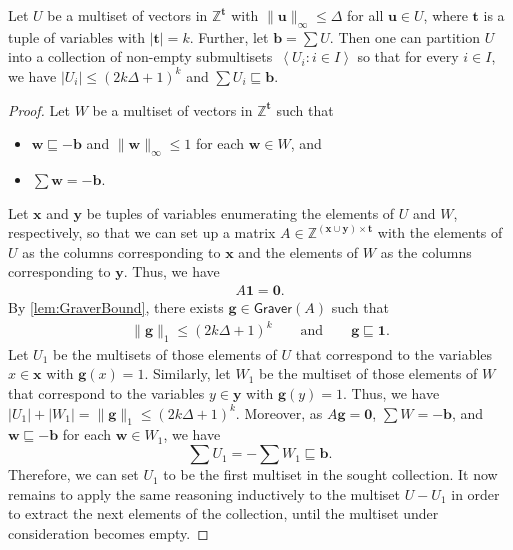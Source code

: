 \documentclass{article}
\renewcommand{\leq}{\leqslant}
\newcommand{\cfleq}{\sqsubseteq}
\newcommand{\Z}{\mathbb{Z}}
\newcommand{\tup}[1]{{\mathbf{#1}}}
\newcommand{\xx}{\tup x}
\newcommand{\ww}{\tup w}
\newcommand{\yy}{\tup y}
\newcommand{\tv}{\tup t}
\newcommand{\bb}{\tup b}
\renewcommand{\gg}{\tup g}
\newcommand{\uu}{\tup u}
\newcommand{\Graver}{\mathsf{Graver}}
\newcommand{\zero}{\tup 0}
\newcommand{\mset}[1]{\left\langle #1\right\rangle}
\renewcommand{\setminus}{-}
\begin{document}
\begin{lemma}\label{lem:bundling}
    Let $U$ be a multiset of vectors in $\Z^\tv$ with $\|\uu\|_\infty\leq \Delta$ for all $\uu\in U$, where $\tv$ is a tuple of variables with $|\tv|=k$. Further, let $\bb=\sum U$. Then one can partition $U$ into a collection of non-empty submultisets~$\mset{U_i\colon i\in I}$ so that for every $i\in I$, we have $|U_i|\leq (2k\Delta+1)^{k}$ and $\sum U_i \cfleq \bb$.
\end{lemma}
\begin{proof}
    Let $W$ be a multiset of vectors in $\Z^{\tv}$ such that
    \begin{itemize}[nosep]
        \item $\ww\cfleq -\bb$ and $\|\ww\|_\infty\leq 1$ for each $\ww\in W$, and
        \item $\sum \ww = -\bb$.
    \end{itemize}
    Let $\xx$ and $\yy$ be tuples of variables enumerating the elements of $U$ and $W$, respectively, so that we can set up a matrix $A\in \Z^{(\xx\cup \yy)\times \tv}$ with the elements of $U$ as the columns corresponding to $\xx$ and the elements of $W$ as the columns corresponding to $\yy$. Thus, we have
    \begin{align*}
        A\mathbf{1}=\zero.
    \end{align*}
    By \cref{lem:GraverBound}, there exists $\gg\in \Graver(A)$ such that
    \begin{align*}
        \|\gg\|_1\leq (2k\Delta+1)^{k}\qquad\textrm{and}\qquad \gg\cfleq \mathbf{1}.
    \end{align*}
    Let $U_1$ be the multisets of those elements of $U$ that correspond to the variables $x\in \xx$ with $\gg(x)=1$. Similarly, let $W_1$ be the multiset of those elements of $W$ that correspond to the variables $y\in \yy$ with $\gg(y)=1$. Thus, we have $|U_1|+|W_1|=\|\gg\|_1\leq (2k\Delta+1)^{k}$. Moreover, as $A\gg=\zero$, $\sum W=-\bb$, and $\ww\cfleq -\bb$ for each $\ww\in W_1$, we have
    \[\sum U_1=-\sum W_1\cfleq \bb.\]
    Therefore, we can set $U_1$ to be the first multiset in the sought collection. It now remains to apply the same reasoning inductively to the multiset $U\setminus U_1$ in order to extract the next elements of the collection, until the multiset under consideration becomes empty.
\end{proof}
\end{document}
